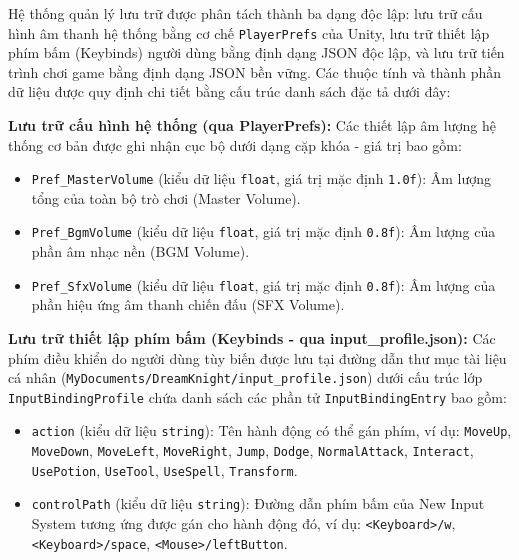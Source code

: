 \documentclass[../DoAn.tex]{subfiles}
\begin{document}
Hệ thống quản lý lưu trữ được phân tách thành ba dạng độc lập: lưu trữ cấu hình âm thanh hệ thống bằng cơ chế \texttt{PlayerPrefs} của Unity, lưu trữ thiết lập phím bấm (Keybinds) người dùng bằng định dạng JSON độc lập, và lưu trữ tiến trình chơi game bằng định dạng JSON bền vững. Các thuộc tính và thành phần dữ liệu được quy định chi tiết bằng cấu trúc danh sách đặc tả dưới đây:

\textbf{Lưu trữ cấu hình hệ thống (qua PlayerPrefs):}
Các thiết lập âm lượng hệ thống cơ bản được ghi nhận cục bộ dưới dạng cặp khóa - giá trị bao gồm:
\begin{itemize}
    \item \texttt{Pref\_MasterVolume} (kiểu dữ liệu \texttt{float}, giá trị mặc định \texttt{1.0f}): Âm lượng tổng của toàn bộ trò chơi (Master Volume).
    \item \texttt{Pref\_BgmVolume} (kiểu dữ liệu \texttt{float}, giá trị mặc định \texttt{0.8f}): Âm lượng của phần âm nhạc nền (BGM Volume).
    \item \texttt{Pref\_SfxVolume} (kiểu dữ liệu \texttt{float}, giá trị mặc định \texttt{0.8f}): Âm lượng của phần hiệu ứng âm thanh chiến đấu (SFX Volume).
\end{itemize}

\textbf{Lưu trữ thiết lập phím bấm (Keybinds - qua input\_profile.json):}
Các phím điều khiển do người dùng tùy biến được lưu tại đường dẫn thư mục tài liệu cá nhân (\texttt{MyDocuments/DreamKnight/input\_profile.json}) dưới cấu trúc lớp \texttt{InputBindingProfile} chứa danh sách các phần tử \texttt{InputBindingEntry} bao gồm:
\begin{itemize}
    \item \texttt{action} (kiểu dữ liệu \texttt{string}): Tên hành động có thể gán phím, ví dụ: \texttt{MoveUp}, \texttt{MoveDown}, \texttt{MoveLeft}, \texttt{MoveRight}, \texttt{Jump}, \texttt{Dodge}, \texttt{NormalAttack}, \texttt{Interact}, \texttt{UsePotion}, \texttt{UseTool}, \texttt{UseSpell}, \texttt{Transform}.
    \item \texttt{controlPath} (kiểu dữ liệu \texttt{string}): Đường dẫn phím bấm của New Input System tương ứng được gán cho hành động đó, ví dụ: \texttt{<Keyboard>/w}, \texttt{<Keyboard>/space}, \texttt{<Mouse>/leftButton}.
\end{itemize}
\end{document}
